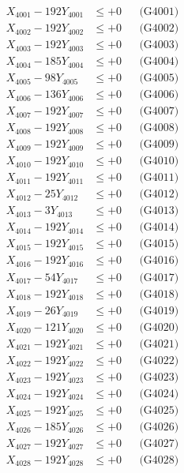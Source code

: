 \documentclass[a4paper,10pt]{article}
\begin{document}
{\begin{align}
\allowbreak
X_{4001} - 192Y_{4001} &\leq +0 && \text{(G4001)} \\
X_{4002} - 192Y_{4002} &\leq +0 && \text{(G4002)} \\
X_{4003} - 192Y_{4003} &\leq +0 && \text{(G4003)} \\
X_{4004} - 185Y_{4004} &\leq +0 && \text{(G4004)} \\
X_{4005} - 98Y_{4005} &\leq +0 && \text{(G4005)} \\
X_{4006} - 136Y_{4006} &\leq +0 && \text{(G4006)} \\
X_{4007} - 192Y_{4007} &\leq +0 && \text{(G4007)} \\
X_{4008} - 192Y_{4008} &\leq +0 && \text{(G4008)} \\
X_{4009} - 192Y_{4009} &\leq +0 && \text{(G4009)} \\
X_{4010} - 192Y_{4010} &\leq +0 && \text{(G4010)} \\
\allowbreak
X_{4011} - 192Y_{4011} &\leq +0 && \text{(G4011)} \\
X_{4012} - 25Y_{4012} &\leq +0 && \text{(G4012)} \\
X_{4013} - 3Y_{4013} &\leq +0 && \text{(G4013)} \\
X_{4014} - 192Y_{4014} &\leq +0 && \text{(G4014)} \\
X_{4015} - 192Y_{4015} &\leq +0 && \text{(G4015)} \\
X_{4016} - 192Y_{4016} &\leq +0 && \text{(G4016)} \\
X_{4017} - 54Y_{4017} &\leq +0 && \text{(G4017)} \\
X_{4018} - 192Y_{4018} &\leq +0 && \text{(G4018)} \\
X_{4019} - 26Y_{4019} &\leq +0 && \text{(G4019)} \\
X_{4020} - 121Y_{4020} &\leq +0 && \text{(G4020)} \\
\allowbreak
X_{4021} - 192Y_{4021} &\leq +0 && \text{(G4021)} \\
X_{4022} - 192Y_{4022} &\leq +0 && \text{(G4022)} \\
X_{4023} - 192Y_{4023} &\leq +0 && \text{(G4023)} \\
X_{4024} - 192Y_{4024} &\leq +0 && \text{(G4024)} \\
X_{4025} - 192Y_{4025} &\leq +0 && \text{(G4025)} \\
X_{4026} - 185Y_{4026} &\leq +0 && \text{(G4026)} \\
X_{4027} - 192Y_{4027} &\leq +0 && \text{(G4027)} \\
X_{4028} - 192Y_{4028} &\leq +0 && \text{(G4028)} \\

\end{align}}
\end{document}

